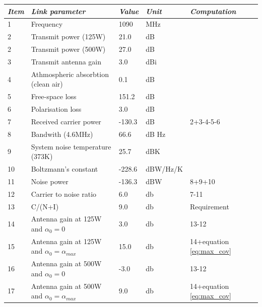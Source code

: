 \begin{center}
 \label{tab:1090}
  \begin{tabular}{ l  l  l  l  l}
    \hline
   \textit{Item} & \textit{Link parameter} & \textit{Value} & \textit{Unit} & \textit{Computation} \\ \hline
    1 & Frequency	& 1090 & MHz & \\ \hline
    2 & Transmit power (125W) & 21.0 & dB & \\ \hline
    2 & Transmit power (500W) & 27.0 & dB & \\ \hline
    3 & Transmit antenna gain & 3.0 & dBi & \\ \hline
    4 & Athmospheric absorbtion (clean air) & 0.1 & dB & \\ \hline
    5 & Free-space loss & 151.2 & dB & \\ \hline
    6 & Polarisation loss & 3.0 & dB & \\ \hline
    7 & Received carrier power & -130.3 & dB & 2+3-4-5-6\\ \hline
    8 & Bandwith (4.6MHz) & 66.6 & dB Hz & \\ \hline 
    9 & System noise temperature (373K) & 25.7 & dBK& \\ \hline 
    10 & Boltzmann's constant & -228.6 & dBW/Hz/K& \\ \hline 
    11 & Noise power & -136.3 & dBW& 8+9+10\\ \hline 
    12 & Carrier to noise ratio & 6.0 & db & 7-11\\ \hline 
    13 & C/(N+I) & 9.0 & db & Requirement\\ \hline
    14 & Antenna gain at 125W and $\alpha_0 = 0 $ & 3.0 & db & 13-12\\ \hline
    15 & Antenna gain at 125W and $\alpha_0 = \alpha_{max} $ & 15.0 & db & 14+equation \ref{eq:max_cov} \\ \hline 
    16 & Antenna gain at 500W and  $\alpha_0 = 0 $  & -3.0 & db & 13-12\\ \hline
    17 & Antenna gain at 500W and $\alpha_0 = \alpha_{max} $ & 9.0 & db & 14+equation \ref{eq:max_cov} \\ \hline \end{tabular}
\end{center}

\iffalse

